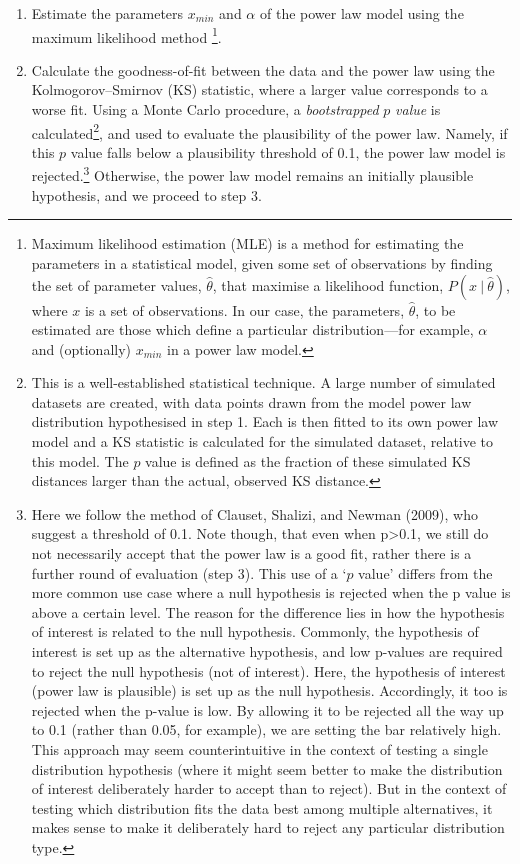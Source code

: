 \begin{enumerate}
\def\labelenumi{\arabic{enumi}.}
\item
  Estimate the parameters \(x_{min}\) and \(\alpha\) of the power law model using the maximum likelihood method \autocites{barndorff-nielsen_inference_1994}{newman_power_2005}\footnote{Maximum likelihood estimation (MLE) is a method for estimating the parameters in a statistical model, given some set of observations by finding the set of parameter values, \(\hat{\theta}\), that maximise a likelihood function, \(P(x\ |\ \hat{\theta})\), where \(x\) is a set of observations. In our case, the parameters, \(\hat{\theta}\), to be estimated are those which define a particular distribution---for example, \(\alpha\) and (optionally) \(x_{min}\) in a power law model.}.
\item
  Calculate the goodness-of-fit between the data and the power law using the Kolmogorov--Smirnov (KS) statistic, where a larger value corresponds to a worse fit. Using a Monte Carlo procedure, a \emph{bootstrapped} \(p\) \emph{value} is calculated\footnote{This is a well-established statistical technique. A large number of simulated datasets are created, with data points drawn from the model power law distribution hypothesised in step 1. Each is then fitted to its own power law model and a KS statistic is calculated for the simulated dataset, relative to this model. The \(p\) value is defined as the fraction of these simulated KS distances larger than the actual, observed KS distance.}, and used to evaluate the plausibility of the power law. Namely, if this \(p\) value falls below a plausibility threshold of 0.1, the power law model is rejected.\footnote{Here we follow the method of Clauset, Shalizi, and Newman (2009), who suggest a threshold of 0.1. Note though, that even when p\textgreater{}0.1, we still do not necessarily accept that the power law is a good fit, rather there is a further round of evaluation (step 3). This use of a `\(p\) value' differs from the more common use case where a null hypothesis is rejected when the p value is above a certain level. The reason for the difference lies in how the hypothesis of interest is related to the null hypothesis. Commonly, the hypothesis of interest is set up as the alternative hypothesis, and low p-values are required to reject the null hypothesis (not of interest). Here, the hypothesis of interest (power law is plausible) is set up as the null hypothesis. Accordingly, it too is rejected when the p-value is low. By allowing it to be rejected all the way up to 0.1 (rather than 0.05, for example), we are setting the bar relatively high. This approach may seem counterintuitive in the context of testing a single distribution hypothesis (where it might seem better to make the distribution of interest deliberately harder to accept than to reject). But in the context of testing which distribution fits the data best among multiple alternatives, it makes sense to make it deliberately hard to reject any particular distribution type.} Otherwise, the power law model remains an initially plausible hypothesis, and we proceed to step 3.

\end{enumerate}
